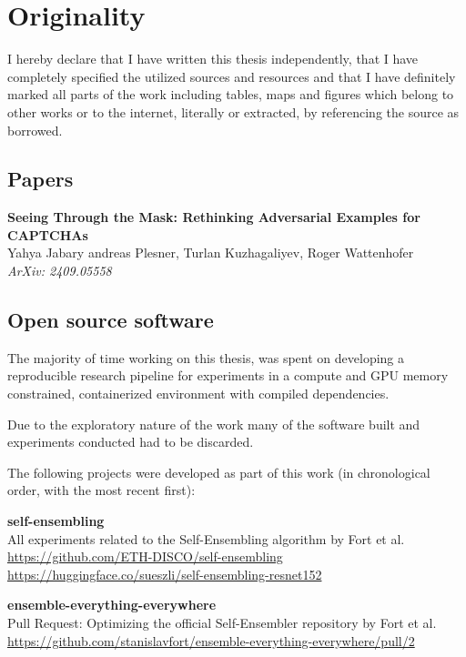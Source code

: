 \documentclass[a4paper, oneside]{discothesis}
\newcommand{\linebreaks}{\vspace*{0.5em}} %
\begin{document}
\chapter*{Originality}

I hereby declare that I have written this thesis independently, that I have completely specified the utilized sources and resources and that I have definitely marked all parts of the work \textendash{} including tables, maps and figures \textendash{} which belong to other works or to the internet, literally or extracted, by referencing the source as borrowed.

\section*{Papers}

\textbf{Seeing Through the Mask: Rethinking Adversarial Examples for CAPTCHAs} \\
Yahya Jabary andreas Plesner, Turlan Kuzhagaliyev, Roger Wattenhofer \\
\textit{ArXiv: 2409.05558}

\section*{Open source software}

The majority of time working on this thesis, was spent on developing a reproducible research pipeline for experiments in a compute and GPU memory constrained, containerized environment with compiled dependencies.

Due to the exploratory nature of the work many of the software built and experiments conducted had to be discarded.

The following projects were developed as part of this work (in chronological order, with the most recent first):

\linebreaks

\textbf{self-ensembling} \\
All experiments related to the Self-Ensembling algorithm by Fort et al. \\
\url{https://github.com/ETH-DISCO/self-ensembling} \\
\url{https://huggingface.co/sueszli/self-ensembling-resnet152}

\linebreaks

\textbf{ensemble-everything-everywhere} \\
Pull Request: Optimizing the official Self-Ensembler repository by Fort et al. \\
\url{https://github.com/stanislavfort/ensemble-everything-everywhere/pull/2}
\end{document}
